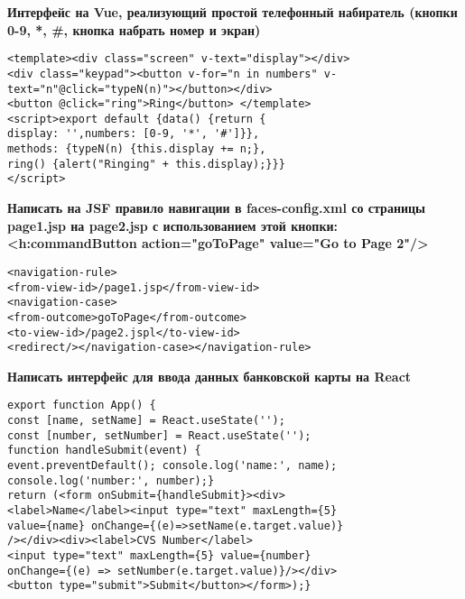 \documentclass{article}
\begin{document}
\begin{minipage}[t]{0.3\textwidth}
    \textbf{Интерфейс на Vue, реализующий простой телефонный набиратель (кнопки 0-9, *, \#, кнопка набрать номер и экран)}
    \begin{lstlisting}[frame=single, basicstyle=\tiny\ttfamily, breaklines=true, breakatwhitespace=true, postbreak=\mbox{\textcolor{red}{$\hookrightarrow$}\space}]
<template><div class="screen" v-text="display"></div>
<div class="keypad"><button v-for="n in numbers" v-text="n"@click="typeN(n)"></button></div>
<button @click="ring">Ring</button> </template>
<script>export default {data() {return {
display: '',numbers: [0-9, '*', '#']}},
methods: {typeN(n) {this.display += n;},
ring() {alert("Ringing" + this.display);}}}
</script>
    \end{lstlisting}
\end{minipage}%
\hfill
\begin{minipage}[t]{0.3\textwidth}
    \textbf{Написать на JSF правило навигации в faces-config.xml со страницы page1.jsp на page2.jsp с использованием этой кнопки: <h:commandButton action="goToPage" value="Go to Page 2"/>}
    \begin{lstlisting}[frame=single, basicstyle=\tiny\ttfamily, breaklines=true, breakatwhitespace=true, postbreak=\mbox{\textcolor{red}{$\hookrightarrow$}\space}]
<navigation-rule>
<from-view-id>/page1.jsp</from-view-id>
<navigation-case>
<from-outcome>goToPage</from-outcome>
<to-view-id>/page2.jspl</to-view-id>
<redirect/></navigation-case></navigation-rule>
    \end{lstlisting}
\end{minipage}%
\hfill
\begin{minipage}[t]{0.3\textwidth}
    \textbf{Написать интерфейс для ввода данных банковской карты на React}
    \begin{lstlisting}[frame=single, basicstyle=\tiny\ttfamily, breaklines=true, breakatwhitespace=true, postbreak=\mbox{\textcolor{red}{$\hookrightarrow$}\space}]
export function App() {
const [name, setName] = React.useState('');
const [number, setNumber] = React.useState('');
function handleSubmit(event) {
event.preventDefault(); console.log('name:', name);
console.log('number:', number);}
return (<form onSubmit={handleSubmit}><div>
<label>Name</label><input type="text" maxLength={5}
value={name} onChange={(e)=>setName(e.target.value)}
/></div><div><label>CVS Number</label>
<input type="text" maxLength={5} value={number}
onChange={(e) => setNumber(e.target.value)}/></div>
<button type="submit">Submit</button></form>);}
    \end{lstlisting}
\end{minipage}%
\end{document}
